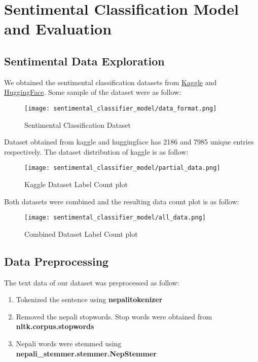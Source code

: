 \chapter{Sentimental Classification Model and Evaluation}
\section{Sentimental Data Exploration}
We obtained the sentimental classification datasets from \href{https://www.kaggle.com/datasets/smaheshacharya/nepali-sentiment-analysis}{Kaggle} and \href{https://huggingface.co/rockerritesh/NepaliSentiment/tree/main}{HuggingFace}. 
Some sample of the dataset were as follow:

\begin{figure}[H]
    \centering
    \texttt{[image: sentimental\_classifier\_model/data\_format.png]}
    \caption{Sentimental Classification Dataset}
    \label{fig:Sentimental Classification Dataset}
\end{figure}

Dataset obtained from kaggle and huggingface has 2186 and 7985 unique entries respectively. The dataset distribution of kaggle is as follow:



\begin{figure}[H]
    \centering
    \texttt{[image: sentimental\_classifier\_model/partial\_data.png]}
    \caption{Kaggle Dataset Label Count plot}
    \label{fig:Kaggle Dataset Label Count plot}
\end{figure}

Both datasets were combined and the resulting data count plot is as follow:
\begin{figure}[H]
    \centering
    \texttt{[image: sentimental\_classifier\_model/all\_data.png]}
    \caption{Combined Dataset Label Count plot}
    \label{fig:Combined Dataset Label Count plot}
\end{figure}

\section{Data Preprocessing}
The text data of our dataset was preprocessed as follow:
\begin{enumerate}
    \item Tokenized the sentence using \textbf{nepalitokenizer}
    \item Removed the nepali stopwords. Stop words were obtained from \textbf{nltk.corpus.stopwords}
    \item Nepali words were stemmed using \textbf{nepali\_stemmer.stemmer.NepStemmer}
\end{enumerate}

